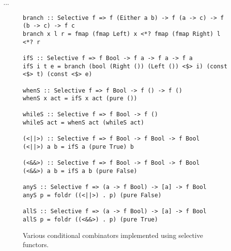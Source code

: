 ...

\begin{figure}
\begin{verbatim}
branch :: Selective f => f (Either a b) -> f (a -> c) -> f (b -> c) -> f c
branch x l r = fmap (fmap Left) x <*? fmap (fmap Right) l <*? r

ifS :: Selective f => f Bool -> f a -> f a -> f a
ifS i t e = branch (bool (Right ()) (Left ()) <$> i) (const <$> t) (const <$> e)

whenS :: Selective f => f Bool -> f () -> f ()
whenS x act = ifS x act (pure ())

whileS :: Selective f => f Bool -> f ()
whileS act = whenS act (whileS act)

(<||>) :: Selective f => f Bool -> f Bool -> f Bool
(<||>) a b = ifS a (pure True) b

(<&&>) :: Selective f => f Bool -> f Bool -> f Bool
(<&&>) a b = ifS a b (pure False)

anyS :: Selective f => (a -> f Bool) -> [a] -> f Bool
anyS p = foldr ((<||>) . p) (pure False)

allS :: Selective f => (a -> f Bool) -> [a] -> f Bool
allS p = foldr ((<&&>) . p) (pure True)
\end{verbatim}
\caption{Various conditional combinators implemented using selective functors.}
\label{fig-library}
\end{figure}